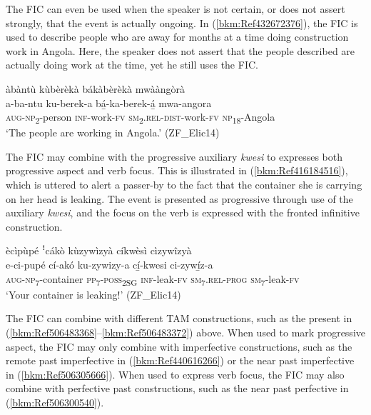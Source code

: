 The FIC can even be used when the speaker is not certain, or does not assert strongly, that the event is actually ongoing. In (\ref{bkm:Ref432672376}), the FIC is used to describe people who are away for months at a time doing construction work in Angola. Here, the speaker does not assert that the people described are actually doing work at the time, yet he still uses the FIC.

\ea
\label{bkm:Ref432672376}
\label{bkm:Ref506483368}
àbàntù kùbèrèkà bákàbèrèkà mwààngòrà\\
\gll a-ba-ntu    ku-berek-a  bá̲-ka-berek-á̲    mwa-angora\\
\textsc{aug}-\textsc{np}\-\textsubscript{2}-person  \textsc{inf}-work-\textsc{fv}  \textsc{sm}\textsubscript{2}.\textsc{rel}-\textsc{dist}-work-\textsc{fv}  \textsc{np}\textsubscript{18}-Angola\\
\glt ‘The people are working in Angola.’ (ZF\_Elic14)
\z

The FIC may combine with the progressive auxiliary \textit{kwesi} to expresses both progressive aspect and verb focus. This is illustrated in (\ref{bkm:Ref416184516}), which is uttered to alert a passer-by to the fact that the container she is carrying on her head is leaking. The event is presented as progressive through use of the auxiliary \textit{kwesi}, and the focus on the verb is expressed with the fronted infinitive construction.

\ea
\label{bkm:Ref416184516}
\label{bkm:Ref506483372}
ècìpùpé ꜝcákò kùzywìzyà cíkwèsì cìzywîzyà\\
\gll e-ci-pupé    cí-akó    ku-zywizy-a  cí̲-kwesi    ci-zywí̲z-a\\
\textsc{aug}-\textsc{np}\textsubscript{7}-container  \textsc{pp}\textsubscript{7}-\textsc{poss}\textsubscript{2SG}  \textsc{inf}-leak-\textsc{fv}  \textsc{sm}\textsubscript{7}.\textsc{rel}-\textsc{prog}  \textsc{sm}\textsubscript{7}-leak-\textsc{fv}\\
\glt ‘Your container is leaking!’ (ZF\_Elic14)
\z

The FIC can combine with different TAM constructions, such as the present in (\ref{bkm:Ref506483368}--\ref{bkm:Ref506483372}) above. When used to mark progressive aspect, the FIC may only combine with imperfective constructions, such as the remote past imperfective in (\ref{bkm:Ref440616266}) or the near past imperfective in (\ref{bkm:Ref506305666}). When used to express verb focus, the FIC may also combine with perfective past constructions, such as the near past perfective in (\ref{bkm:Ref506300540}).

